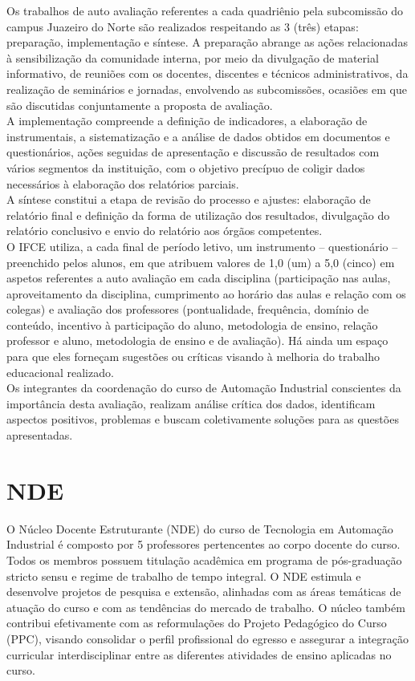 Os trabalhos de auto avaliação referentes a cada quadriênio pela subcomissão do campus Juazeiro do Norte são realizados respeitando as 3 (três) etapas: preparação, implementação e síntese. A preparação abrange as ações relacionadas à sensibilização da comunidade interna, por meio da divulgação de material informativo, de reuniões com os docentes, discentes e técnicos administrativos, da realização de seminários e jornadas, envolvendo as subcomissões, ocasiões em que são discutidas conjuntamente a proposta de avaliação.\\

A implementação compreende a definição de indicadores, a elaboração de instrumentais, a sistematização e a análise de dados obtidos em documentos e questionários, ações seguidas de apresentação e discussão de resultados com vários segmentos da instituição, com o objetivo precípuo de coligir dados necessários à elaboração dos relatórios parciais.\\

A síntese constitui a etapa de revisão do processo e ajustes: elaboração de relatório final e definição da forma de utilização dos resultados, divulgação do relatório conclusivo e envio do relatório aos órgãos competentes.\\

O IFCE utiliza, a cada final de período letivo, um instrumento – questionário – preenchido pelos alunos, em que atribuem valores de 1,0 (um) a 5,0 (cinco) em aspetos referentes a auto avaliação em cada disciplina (participação nas aulas, aproveitamento da disciplina, cumprimento ao horário das aulas e relação com os colegas) e avaliação dos professores (pontualidade, frequência, domínio de conteúdo, incentivo à participação do aluno, metodologia de ensino, relação professor e aluno, metodologia de ensino e de avaliação). Há ainda um espaço para que eles forneçam sugestões ou críticas visando à melhoria do trabalho educacional realizado.\\

Os integrantes da coordenação do curso de Automação Industrial conscientes da importância desta avaliação, realizam análise crítica dos dados, identificam aspectos positivos, problemas e buscam coletivamente soluções para as questões apresentadas.\\

\section{NDE}
O Núcleo Docente Estruturante (NDE) do curso de Tecnologia em Automação Industrial é composto por 5 professores pertencentes ao corpo docente do curso. Todos os membros possuem titulação acadêmica em programa de pós-graduação stricto sensu e regime de trabalho de tempo integral. O NDE estimula e desenvolve projetos de pesquisa e extensão, alinhadas com as áreas temáticas de atuação do curso e com as tendências do mercado de trabalho. O núcleo também contribui efetivamente com as reformulações do Projeto Pedagógico do Curso (PPC), visando consolidar o perfil profissional do egresso e assegurar a integração curricular interdisciplinar entre as diferentes atividades de ensino aplicadas no curso.\\

